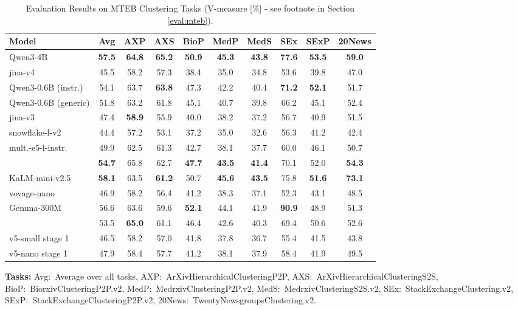 \documentclass[11pt]{article}
\begin{document}
\begin{table}[H]
\caption{Evaluation Results on MTEB Clustering Tasks (V-measure [\%] - see footnote in Section \ref{eval:mteb}).}
\label{tab:mteb_en_clustering}
\setlength{\tabcolsep}{3pt}
\centering
\small
\begin{tabular}{l*{9}{c}}
\toprule
\textbf{Model} & \textbf{Avg} & \textbf{AXP} & \textbf{AXS} & \textbf{BioP} & \textbf{MedP} & \textbf{MedS} & \textbf{SEx} & \textbf{SExP} & \textbf{20News} \\
\midrule
Qwen3-4B & \textbf{57.5} & \textbf{64.8} & \textbf{65.2} & \textbf{50.9} & \textbf{45.3} & \textbf{43.8} & \textbf{77.6} & \textbf{53.5} & \textbf{59.0} \\
jina-v4 & 45.5 & 58.2 & 57.3 & 38.4 & 35.0 & 34.8 & 53.6 & 39.8 & 47.0 \\
\midrule
Qwen3-0.6B (instr.) & 54.1 & 63.7 & \textbf{63.8} & 47.3 & 42.2 & 40.4 & \textbf{71.2} & \textbf{52.1} & 51.7 \\
Qwen3-0.6B (generic) & 51.8 & 63.2 & 61.8 & 45.1 & 40.7 & 39.8 & 66.2 & 45.1 & 52.4 \\
jina-v3 & 47.4 & \textbf{58.9} & 55.9 & 40.0 & 38.2 & 37.2 & 56.7 & 40.9 & 51.5 \\
snowflake-l-v2 & 44.4 & 57.2 & 53.1 & 37.2 & 35.0 & 32.6 & 56.3 & 41.2 & 42.4 \\
mult.-e5-l-instr. & 49.9 & 62.5 & 61.3 & 42.7 & 38.1 & 37.7 & 60.0 & 46.1 & 50.7 \\
\JEmbeddingVFiveTextSmallShort{} & \textbf{54.7} & 65.8 & 62.7 & \textbf{47.7} & \textbf{43.5} & \textbf{41.4} & 70.1 & 52.0 & \textbf{54.3} \\
\midrule
KaLM-mini-v2.5 & \textbf{58.1} & 63.5 & \textbf{61.2} & 50.7 & \textbf{45.6} & \textbf{43.5} & 75.8 & \textbf{51.6} & \textbf{73.1} \\
voyage-nano & 46.9 & 58.2 & 56.4 & 41.2 & 38.3 & 37.1 & 52.3 & 43.1 & 48.5 \\
Gemma-300M & 56.6 & 63.6 & 59.6 & \textbf{52.1} & 44.1 & 41.9 & \textbf{90.9} & 48.9 & 51.3 \\
\JEmbeddingVFiveTextNanoShort{} & 53.5 & \textbf{65.0} & 61.1 & 46.4 & 42.6 & 40.3 & 69.4 & 50.6 & 52.6 \\
\midrule
v5-small stage 1 & 46.5 & 58.2 & 57.0 & 41.8 & 37.8 & 36.7 & 55.4 & 41.5 & 43.8 \\
v5-nano stage 1 & 47.9 & 58.4 & 57.7 & 41.2 & 38.1 & 37.9 & 58.4 & 41.9 & 49.5 \\
\bottomrule
\end{tabular}
\medskip
\begin{flushleft}
\textbf{Tasks:} Avg:~Average over all tasks,
AXP:~ArXivHierarchicalClusteringP2P,
AXS:~ArXivHierarchicalClusteringS2S,
BioP:~BiorxivClusteringP2P.v2,
MedP:~MedrxivClusteringP2P.v2,
MedS:~MedrxivClusteringS2S.v2,
SEx:~StackExchangeClustering.v2,
SExP:~StackExchangeClusteringP2P.v2,
20News:~TwentyNewsgroupsClustering.v2.\\
\end{flushleft}
\end{table}
\end{document}
